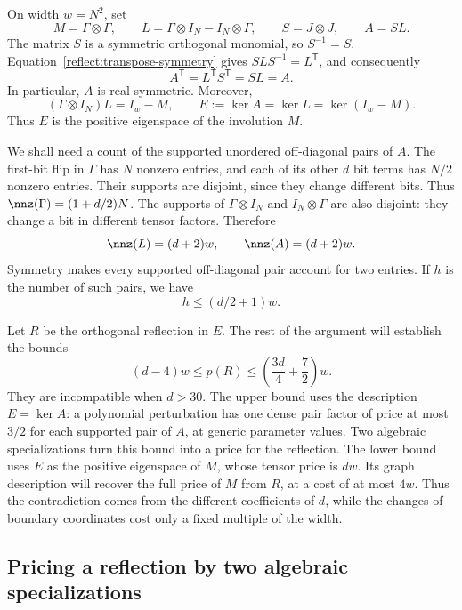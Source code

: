 On width $w=N^2$, set
\begin{equation}
 M=\Gamma\otimes\Gamma,\qquad
 L=\Gamma\otimes I_N-I_N\otimes\Gamma,\qquad
 S=J\otimes J,\qquad A=SL.
 \label{reflect:large-operators}
\end{equation}
The matrix $S$ is a symmetric orthogonal monomial, so $S^{-1}=S$.
Equation~\eqref{reflect:transpose-symmetry} gives
$SLS^{-1}=L^{\mathsf T}$, and consequently
\[
 A^{\mathsf T}=L^{\mathsf T}S^{\mathsf T}=SL=A.
\]
In particular, $A$ is real symmetric.  Moreover,
\begin{equation}
 (\Gamma\otimes I_N)L=I_w-M,
 \qquad
 E:=\ker A=\ker L=\ker(I_w-M).
 \label{reflect:kernel}
\end{equation}
Thus $E$ is the positive eigenspace of the involution $M$.

We shall need a count of the supported unordered off-diagonal pairs
of $A$.  The first-bit flip in $\Gamma$ has $N$ nonzero entries, and
each of its other $d$ bit terms has $N/2$ nonzero entries.  Their
supports are disjoint, since they change different bits.  Thus
$\nnz(\Gamma)=(1+d/2)N$.
The supports of $\Gamma\otimes I_N$ and $I_N\otimes\Gamma$ are
also disjoint: they change a bit in different tensor factors.
Therefore
\[
 \nnz(L)=(d+2)w,\qquad \nnz(A)=(d+2)w.
\]
Symmetry makes every supported off-diagonal pair account for two
entries.  If $h$ is the number of such pairs, we have
\begin{equation}
 h\leq (d/2+1)w.
 \label{reflect:pair-count}
\end{equation}

Let $R$ be the orthogonal reflection in $E$. The rest of the argument
will establish the bounds
\[
 (d-4)w\leq p(R)\leq
 \left(\frac{3d}{4}+\frac72\right)w.
\]
They are incompatible when $d>30$.
The upper bound uses the description $E=\ker A$: a polynomial
perturbation has one dense pair factor of price at most $3/2$ for
each supported pair of $A$, at generic parameter values. Two algebraic
specializations turn this bound into a price for the reflection.
The lower bound uses $E$ as the positive eigenspace of $M$, whose
tensor price is $dw$.
Its graph description will recover the full price of $M$ from $R$, at
a cost of at most $4w$. Thus the contradiction comes from the different
coefficients of $d$, while the changes of boundary coordinates cost
only a fixed multiple of the width.

\subsection{Pricing a reflection by two algebraic specializations}

